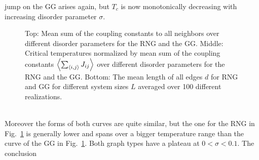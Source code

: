         jump on the GG arises again, but \(T_c\) is now monotonically
        decreasing with increasing disorder parameter \(\sigma\).
        \begin{figure}[hbtp]
            \centering



            \caption[Critical Temperature Normalized by Mean Sum of the Coupling Constants]
            {
                Top: Mean sum of the coupling constants to all
                neighbors over different disorder parameters for
                 the RNG and
                 the GG.
                Middle: Critical temperatures normalized by mean sum of the
                coupling constants \(\left< \sum_{\left< i,j \right>} J_{ij} \right>\) over different
                disorder parameters for
                 the RNG and
                 the GG.
                Bottom: The mean length of all edges \(d\) for
                 RNG
                and  GG for different system sizes \(L\)
                averaged over 100 different realizations.
            }
            \label{fig:TcJ}
        \end{figure}\\
        Moreover the forms of both curves are quite similar, but the
        one for the RNG in Fig.\ \ref{fig:TcJ}
        is generally lower and spans over a bigger temperature range than
        the curve of the GG in Fig.\ \ref{fig:TcJ}.
        Both graph types have a plateau at \(0 < \sigma < 0.1\). The conclusion
